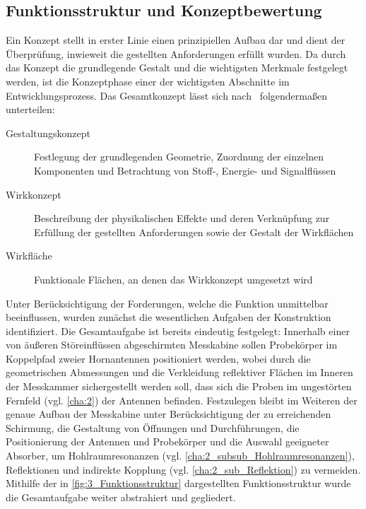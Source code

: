 


\subsection{Funktionsstruktur und Konzeptbewertung}

Ein Konzept stellt in erster Linie einen prinzipiellen Aufbau dar und dient der Überprüfung, inwieweit die gestellten Anforderungen erfüllt wurden. Da durch das Konzept die grundlegende Gestalt und die wichtigsten Merkmale festgelegt werden, ist die Konzeptphase einer der wichtigsten Abschnitte im Entwicklungsprozess. Das Gesamtkonzept lässt sich nach~\cite{Pahl_Beitz_Konstruktionslehre} folgendermaßen unterteilen:

\begin{description}
    \item[Gestaltungskonzept] Festlegung der grundlegenden Geometrie, Zuordnung der einzelnen Komponenten und Betrachtung von Stoff-, Energie- und Signalflüssen
    \item[Wirkkonzept] Beschreibung der physikalischen Effekte und deren Verknüpfung zur Erfüllung der gestellten Anforderungen sowie der Gestalt der Wirkflächen
    \item[Wirkfläche] Funktionale Flächen, an denen das Wirkkonzept umgesetzt wird
\end{description}

Unter Berücksichtigung der Forderungen, welche die Funktion unmittelbar beeinflussen, wurden zunächst die wesentlichen Aufgaben der Konstruktion identifiziert. Die Gesamtaufgabe ist bereits eindeutig festgelegt: Innerhalb einer von äußeren Störeinflüssen abgeschirmten Messkabine sollen Probekörper im Koppelpfad zweier Hornantennen positioniert werden, wobei durch die geometrischen Abmessungen und die Verkleidung reflektiver Flächen im Inneren der Messkammer sichergestellt werden soll, dass sich die Proben im ungestörten Fernfeld (vgl. \Kapitel\ref{cha:2}) der Antennen befinden. Festzulegen bleibt im Weiteren der genaue Aufbau der Messkabine unter Berücksichtigung der zu erreichenden Schirmung, die Gestaltung von Öffnungen und Durchführungen, die Positionierung der Antennen und Probekörper und die Auswahl geeigneter Absorber, um Hohlraumresonanzen (vgl. \Abschnitt\ref{cha:2_subsub_Hohlraumresonanzen}), Reflektionen und indirekte Kopplung (vgl. \Abschnitt\ref{cha:2_sub_Reflektion}) zu vermeiden. Mithilfe der in \Abb\ref{fig:3_Funktionsstruktur} dargestellten Funktionsstruktur wurde die Gesamtaufgabe weiter abstrahiert und gegliedert. %

